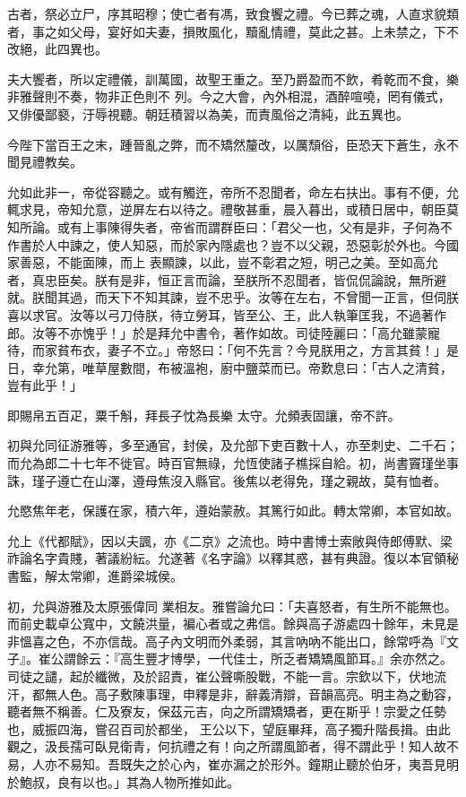 \begin{pinyinscope}
 古者，祭必立尸，序其昭穆；使亡者有馮，致食饗之禮。今已葬之魂，人直求貌類者，事之如父母，宴好如夫妻，損敗風化，黷亂情禮，莫此之甚。上未禁之，下不改絕，此四異也。



 夫大饗者，所以定禮儀，訓萬國，故聖王重之。至乃爵盈而不飲，肴乾而不食，樂非雅聲則不奏，物非正色則不
 列。今之大會，內外相混，酒醉喧嘵，罔有儀式，又俳優鄙褻，汙辱視聽。朝廷積習以為美，而責風俗之清純，此五異也。



 今陛下當百王之末，踵晉亂之弊，而不矯然釐改，以厲頹俗，臣恐天下蒼生，永不聞見禮教矣。



 允如此非一，帝從容聽之。或有觸迕，帝所不忍聞者，命左右扶出。事有不便，允輒求見，帝知允意，逆屏左右以待之。禮敬甚重，晨入暮出，或積日居中，朝臣莫知所論。或有上事陳得失者，帝省而謂群臣曰：「君父一也，父有是非，子何為不作書於人中諫之，使人知惡，而於家內隱處也？豈不以父親，恐惡彰於外也。今國家善惡，不能面陳，而上
 表顯諫，以此，豈不彰君之短，明己之美。至如高允者，真忠臣矣。朕有是非，恒正言而論，至朕所不忍聞者，皆侃侃論說，無所避就。朕聞其過，而天下不知其諫，豈不忠乎。汝等在左右，不曾聞一正言，但伺朕喜以求官。汝等以弓刀侍朕，待立勞耳，皆至公、王，此人執筆匡我，不過著作郎。汝等不亦愧乎！」於是拜允中書令，著作如故。司徒陸麗曰：「高允雖蒙寵待，而家貧布衣，妻子不立。」帝怒曰：「何不先言？今見朕用之，方言其貧！」是日，幸允第，唯草屋數間，布被溫袍，廚中鹽菜而已。帝歎息曰：「古人之清貧，豈有此乎！」



 即賜帛五百疋，粟千斛，拜長子忱為長樂
 太守。允頻表固讓，帝不許。



 初與允同征游雅等，多至通官，封侯，及允部下吏百數十人，亦至刺史、二千石；而允為郎二十七年不徙官。時百官無祿，允恆使諸子樵採自給。初，尚書竇瑾坐事誅，瑾子遵亡在山澤，遵母焦沒入縣官。後焦以老得免，瑾之親故，莫有恤者。



 允愍焦年老，保護在家，積六年，遵始蒙赦。其篤行如此。轉太常卿，本官如故。



 允上《代都賦》，因以夫諷，亦《二京》之流也。時中書博士索敞與侍郎傅默、梁祚論名字貴賤，著議紛紜。允遂著《名字論》以釋其惑，甚有典證。復以本官領秘書監，解太常卿，進爵梁城侯。



 初，允與游雅及太原張偉同
 業相友。雅嘗論允曰：「夫喜怒者，有生所不能無也。而前史載卓公寬中，文饒洪量，褊心者或之弗信。餘與高子游處四十餘年，未見是非慍喜之色，不亦信哉。高子內文明而外柔弱，其言吶吶不能出口，餘常呼為『文子』。崔公謂餘云：『高生豐才博學，一代佳士，所乏者矯矯風節耳。』余亦然之。司徒之譴，起於纖微，及於詔責，崔公聲嘶股戰，不能一言。宗欽以下，伏地流汗，都無人色。高子敷陳事理，申釋是非，辭義清辯，音韻高亮。明主為之動容，聽者無不稱善。仁及寮友，保茲元吉，向之所謂矯矯者，更在斯乎！宗愛之任勢也，威振四海，嘗召百司於都坐，
 王公以下，望庭畢拜，高子獨升階長揖。由此觀之，汲長孺可臥見衛青，何抗禮之有！向之所謂風節者，得不謂此乎！知人故不易，人亦不易知。吾既失之於心內，崔亦漏之於形外。鐘期止聽於伯牙，夷吾見明於鮑叔，良有以也。」其為人物所推如此。




\end{pinyinscope}
